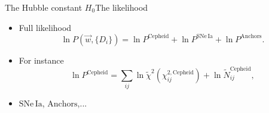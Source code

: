 \documentclass{beamer}
\newcommand{\Cepheid}{\mathrm{Cepheid}}
\newcommand{\Anchors}{\mathrm{Anchors}}
\newcommand{\SNe}{\mathrm{SNe\,Ia}}
\begin{document}
\begin{frame}{The Hubble constant $H_0$}{The likelihood}
\begin{itemize}
\item Full likelihood 
\begin{equation*}
\ln P(\vec{w},\lbrace D_i \rbrace) = \ln P^{\Cepheid} + \ln P^{\SNe} + \ln P^{\Anchors}. 
\end{equation*}
\item For instance
\begin{equation*}
\ln P^{\Cepheid} = \sum_{ij} \ln \tilde{\chi}^{2}(\chi^{2,\Cepheid}_{ij}) + \ln \tilde{N}^{\Cepheid}_{ij},
\end{equation*}
\item $\SNe$, $\Anchors$,...
\end{itemize}
\end{frame}
\end{document}
